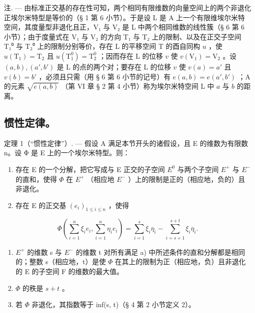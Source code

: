 注. --- 由标准正交基的存在性可知，两个相同有限维数的向量空间上的两个非退化正埃尔米特型是等价的（§ 1 第 6 小节）。于是设 L 是 A 上一个有限维埃尔米特空间，其度量型非退化且正，V₁ 与 V₂ 是 L 中两个相同维数的线性簇（§ 6 第 6 小节）；由于度量式在 V₁ 与 V₂ 的方向 T₁ 与 T₂ 上的限制、以及在正交子空间 T₁⁰ 与 T₂⁰ 上的限制分别等价，存在 L 的平移空间 T 的酉自同构 \(u\) ，使 \(u(\mathrm{T}_1) = \mathrm{T}_2\) 且 \(u(\mathrm{T}_1^0) = \mathrm{T}_2^0\) ；因而存在 L 的位移 \(v\) 使 \(v(\mathrm{V}_1) = \mathrm{V}_2\) 。设 \((a, b), (a', b')\) 是 L 的点的两个对；要存在 L 的位移 \(v\) 使 \(v(a) = a'\) 且 \(v(b) = b'\) ，必须且只需（用 § 6 第 6 小节的记号）有 \(e(a, b) = e(a', b')\) ；A 的元素 \(\sqrt{e(a, b)}\) （第 VI 章 § 2 第 4 小节）称为埃尔米特空间 L 中 \(a\) 与 \(b\) 的距离。

\subsection{惯性定律。}

定理 1（“惯性定律”）. --- 假设 A 满足本节开头的诸假设，且 E 的维数为有限数 n。设 Φ 是 E 上的一个埃尔米特型。则：

\begin{enumerate}
\def\labelenumi{\alph{enumi})}
\item
  存在 E 的一个分解，把它写成与 E 正交的子空间 \(E^{0}\) 与两个子空间 \(E^{+}\) 与 \(E^{-}\) 的直和，使得 \(\Phi\) 在 \(E^{+}\) （相应地 \(E^{-}\) ）上的限制是正的（相应地，负的）且非退化。
\item
  存在 E 的正交基 \((e_i)_{1\leqslant i\leqslant n}\) ，使得
\end{enumerate}

\[
\Phi (\sum_ {i = 1} ^ {n} \xi_ {i} e _ {i}, \sum_ {i = 1} ^ {n} \eta_ {i} e _ {i}) = \sum_ {i = 1} ^ {s} \xi_ {i} \overline {{\eta}} _ {i} - \sum_ {i = s + 1} ^ {s + t} \xi_ {i} \overline {{\eta}} _ {i}.\tag{2}
\]

\begin{enumerate}
\def\labelenumi{\alph{enumi})}
\setcounter{enumi}{2}
\item
  \(E^{+}\) 的维数 s 与 \(E^{-}\) 的维数 t 对所有满足 a) 中所述条件的直和分解都是相同的；整数 s（相应地，t）是使 \(\Phi\) 在其上的限制为正（相应地，负）且非退化的 E 的子空间 F 的维数的最大值。
\item
  \(\Phi\) 的秩是 \(s + t\) 。
\item
  若 \(\Phi\) 非退化，其指数等于 inf(s, t)（§ 4 第 2 小节定义 2）。
\end{enumerate}

